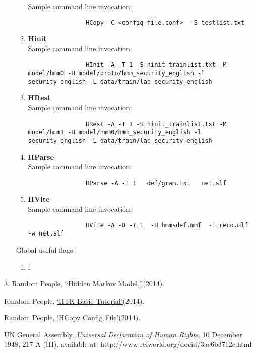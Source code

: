 \documentclass{wileySev}
\begin{document}
\begin{enumerate}
\begin{enumerate}
				Sample command line invocation: 
				\begin{verbatim}
				HCopy -C <config_file.conf>  -S testlist.txt
				\end{verbatim}
			\item \textbf{Hinit}\\
				Sample command line invocation: 
				\begin{verbatim}
				HInit -A -T 1 -S hinit_trainlist.txt -M model/hmm0 -H model/proto/hmm_security_english -l security_english -L data/train/lab security_english
				\end{verbatim}
			\item \textbf{HRest}\\
				Sample command line invocation: 
				\begin{verbatim}
				HRest -A -T 1 -S hinit_trainlist.txt -M model/hmm1 -H model/hmm0/hmm_security_english -l security_english -L data/train/lab security_english
				\end{verbatim}
			\item \textbf{HParse}\\
				Sample command line invocation: 
				\begin{verbatim}
				HParse -A -T 1   def/gram.txt   net.slf
				\end{verbatim}
			\item \textbf{HVite}\\
				Sample command line invocation: 
				\begin{verbatim}
				HVite -A -D -T 1  -H hmmsdef.mmf  -i reco.mlf  -w net.slf
				\end{verbatim}
		\end{enumerate}
		Global useful flags:
		\begin{enumerate}
			\item f
		\end{enumerate}
\end{enumerate}


\begin{references}{3.}
Random People,
\href{http://en.wikipedia.org/wiki/Hidden_Markov_model}{``Hidden Markov Model,''}(2014).

Random People,
\href{http://www.labunix.uqam.ca/~boukadoum_m/DIC9315/Notes/Markov/HTK_basic_tutorial.pdf}{`HTK Basic Tutorial'}(2014).

Random People,
\href{http://www.voxforge.org/home/dev/acousticmodels/linux/create/htkjulius/tutorial/data-prep/step-5}{`HCopy Config File'}(2014).

                 
UN General Assembly,
		{\it Universal Declaration of Human Rights}, 10 December 1948, 217 A (III), available at: http://www.refworld.org/docid/3ae6b3712c.html 

\end{references}


\printindex
\end{document}
